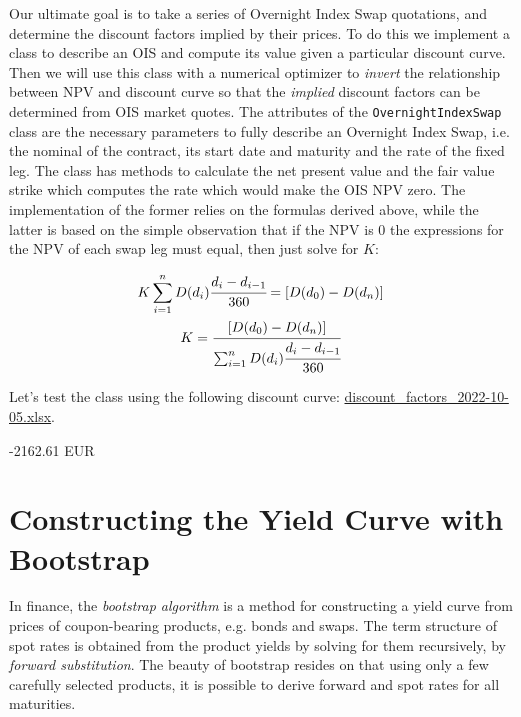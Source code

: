 \begin{finmarkets}
Our ultimate goal is to take a series of Overnight Index Swap quotations, and determine the discount factors implied by their prices. To do this we implement a class to describe an OIS and compute its value given a particular discount curve. Then we will use this class with a numerical optimizer to \emph{invert} the relationship between NPV and discount curve so that the \emph{implied} discount factors can be determined from OIS market quotes.
The attributes of the \texttt{OvernightIndexSwap} class are the necessary parameters to fully describe an Overnight Index Swap, i.e. the nominal of the contract, its start date and maturity and the rate of the fixed leg. The class has methods to calculate the net present value and the fair value strike which computes the rate which would make the OIS NPV zero. The implementation of the former relies on the formulas derived above, while the latter is based on the simple observation that if the NPV is 0 the expressions for the NPV of each swap leg must equal, then just solve for $K$:

\begin{equation}
\begin{gathered}
K \sum_{i=1}^{n}D(d_{i})\cfrac{d_i - d_{i-1}}{360} = [D(d_0) - D(d_n)] \\
K = \cfrac{[D(d_0) - D(d_n)]}{\sum_{i=1}^{n}D(d_{i})\cfrac{d_i - d_{i-1}}{360}}
\end{gathered}
\end{equation}
\end{finmarkets}


Let's test the class using the following discount curve: \href{https://github.com/matteosan1/finance_course/raw/master/input_files/discount_factors_2022-10-05.xlsx}{discount\_factors\_2022-10-05.xlsx}.


\begin{ioutput}
-2162.61 EUR
\end{ioutput}

\section{Constructing the Yield Curve with Bootstrap}
\label{the-bootstrapping-technique}

In finance, the \emph{bootstrap algorithm} is a method for constructing a yield curve from prices of coupon-bearing products, e.g. bonds and swaps. The term structure of spot rates is obtained from the product yields by solving for them recursively, by \emph{forward substitution}. 
The beauty of bootstrap resides on that using only a few carefully selected products, it is possible to derive forward and spot rates for all maturities.

